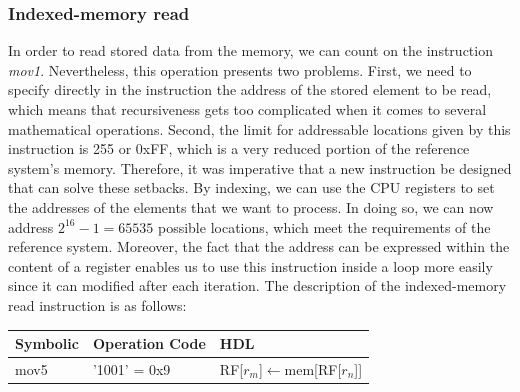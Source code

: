 \documentclass[]{article}
\begin{document}
\subsubsection{Indexed-memory read}

In order to read stored data from the memory, we can count on the instruction \textit{mov1}. Nevertheless, this operation presents two problems. First, we need to specify directly in the instruction the address of the stored element to be read, which means that recursiveness gets too complicated when it comes to several mathematical operations. Second, the limit for addressable locations given by this instruction is 255 or 0xFF, which is a very reduced portion of the reference system's memory. Therefore, it was imperative that a new instruction be designed that can solve these setbacks. By indexing, we can use the CPU registers to set the addresses of the elements that we want to process. In doing so, we can now address $2^{16}-1=65535$ possible locations, which meet the requirements of the reference system. Moreover, the fact that the address can be expressed within the content of a register enables us to use this instruction inside a loop more easily since it can modified after each iteration. The description of the indexed-memory read instruction is as follows:
\begin{table}[h]
	\centering
	{
		\begin{tabular}{|p{3cm}|p{3cm}|p{3.2cm}|}
			\hline
			\textbf{Symbolic} & \textbf{Operation Code} & \textbf{HDL} \\
			\hline
			mov5 & '1001' = 0x9 & RF[$r_m$]$\leftarrow$mem[RF[$r_n$]]\\
			\hline
		\end{tabular}
	}
\end{table}
\end{document}
